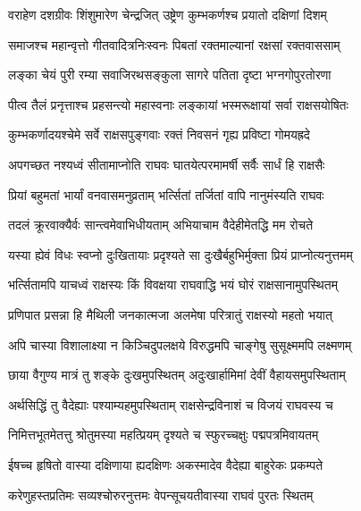 \twolineshloka
{वराहेण दशग्रीवः शिंशुमारेण चेन्द्रजित्}
{उष्ट्रेण कुम्भकर्णश्च प्रयातो दक्षिणां दिशम्} %

\twolineshloka
{समाजश्च महान्वृत्तो गीतवादित्रनिःस्वनः}
{पिबतां रक्तमाल्यानां रक्षसां रक्तवाससाम्} %

\twolineshloka
{लङ्का चेयं पुरी रम्या सवाजिरथसङ्कुला}
{सागरे पतिता दृष्टा भग्नगोपुरतोरणा} %

\twolineshloka
{पीत्व तैलं प्रनृत्ताश्च प्रहसन्त्यो महास्वनाः}
{लङ्कायां भस्मरूक्षायां सर्वा राक्षसयोषितः} %

\twolineshloka
{कुम्भकर्णादयश्चेमे सर्वे राक्षसपुङ्गवाः}
{रक्तं निवसनं गृह्य प्रविष्टा गोमयह्रदे} %

\twolineshloka
{अपगच्छत नश्यध्वं सीतामाप्नोति राघवः}
{घातयेत्परमामर्षी सर्वैः सार्धं हि राक्षसैः} %

\twolineshloka
{प्रियां बहुमतां भार्यां वनवासमनुव्रताम्}
{भर्त्सितां तर्जितां वापि नानुमंस्यति राघवः} %

\twolineshloka
{तदलं क्रूरवाक्यैर्वः सान्त्वमेवाभिधीयताम्}
{अभियाचाम वैदेहीमेतद्धि मम रोचते} %

\twolineshloka
{यस्या ह्येवं विधः स्वप्नो दुःखितायाः प्रदृश्यते}
{सा दुःखैर्बहुभिर्मुक्ता प्रियं प्राप्नोत्यनुत्तमम्} %

\twolineshloka
{भर्त्सितामपि याचध्वं राक्षस्यः किं विवक्षया}
{राघवाद्धि भयं घोरं राक्षसानामुपस्थितम्} %

\twolineshloka
{प्रणिपात प्रसन्ना हि मैथिली जनकात्मजा}
{अलमेषा परित्रातुं राक्षस्यो महतो भयात्} %

\twolineshloka
{अपि चास्या विशालाक्ष्या न किञ्चिदुपलक्षये}
{विरुद्धमपि चाङ्गेषु सुसूक्ष्ममपि लक्ष्मणम्} %

\twolineshloka
{छाया वैगुण्य मात्रं तु शङ्के दुःखमुपस्थितम्}
{अदुःखार्हामिमां देवीं वैहायसमुपस्थिताम्} %

\twolineshloka
{अर्थसिद्धिं तु वैदेह्याः पश्याम्यहमुपस्थिताम्}
{राक्षसेन्द्रविनाशं च विजयं राघवस्य च} %

\twolineshloka
{निमित्तभूतमेतत्तु श्रोतुमस्या महत्प्रियम्}
{दृश्यते च स्फुरच्चक्षुः पद्मपत्रमिवायतम्} %

\twolineshloka
{ईषच्च हृषितो वास्या दक्षिणाया ह्यदक्षिणः}
{अकस्मादेव वैदेह्या बाहुरेकः प्रकम्पते} %

\twolineshloka
{करेणुहस्तप्रतिमः सव्यश्चोरुरनुत्तमः}
{वेपन्सूचयतीवास्या राघवं पुरतः स्थितम्} %

